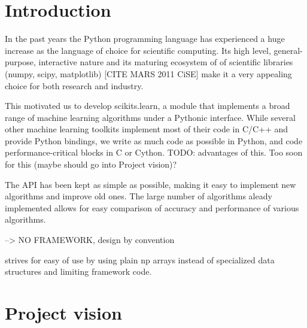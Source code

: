 \documentclass[twoside,11pt]{article}
\begin{document}
\section{Introduction}
In the past years the Python programming language has experienced a
huge increase as the language of choice for scientific computing. Its
high level, general-purpose, interactive nature and its maturing
ecosystem of of scientific libraries (numpy, scipy, matplotlib) [CITE
  MARS 2011 CiSE] make it a very appealing choice for both research
and industry.


This motivated us to develop scikits.learn, a module that implements a
broad range of machine learning algorithms under a Pythonic
interface. While several other machine learning toolkits implement
most of their code in C/C++ and provide Python bindings, we write as
much code as possible in Python, and code performance-critical blocks
in C or Cython. TODO: advantages of this. Too soon for this (maybe
should go into Project vision)?


The API has been kept as simple as possible, making it easy to
implement new algorithms and improve old ones. The large number of
algorithms aleady implemented allows for easy comparison of accuracy
and performance of various algorithms.

--> NO FRAMEWORK, design by convention

strives for easy of use by using plain np arrays instead of specialized
data structures and limiting framework code.


\section{Project vision}
\end{document}
